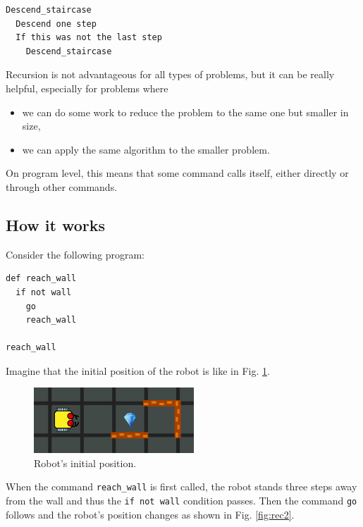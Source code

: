 \documentclass[article,A4,12pt]{llncs}
\begin{document}
{{{{\begin{verbatim}
Descend_staircase
  Descend one step
  If this was not the last step
    Descend_staircase
\end{verbatim}
Recursion is not advantageous for all types of problems, but it can be really 
helpful, especially for problems where 
\begin{itemize}
\item we can do some work to reduce the problem to the same one but smaller in size, 
\item we can apply the same algorithm to the smaller problem. 
\end{itemize}
On program level, this means that some command calls itself, either 
directly or through other commands.

\subsection{How it works} 

Consider the following program:
\begin{verbatim}
def reach_wall
  if not wall
    go
    reach_wall

reach_wall
\end{verbatim}
Imagine that the initial position of the robot is like in Fig. \ref{fig:rec1}.


\begin{figure}[!ht]
\begin{center}
\includegraphics[width=6cm]{img/rec-1.png}
\end{center}
\vspace{-4mm}
\caption{Robot's initial position.}
\label{fig:rec1}
\vspace{-4mm}
\end{figure}
\noindent
When the command {\tt reach\_wall} is first called, the robot stands three steps away from the wall and 
thus the {\tt if not wall} condition passes. Then the command {\tt go} follows and the robot's 
position changes as shown in Fig. \ref{fig:rec2}. 

}}}}
\end{document}
